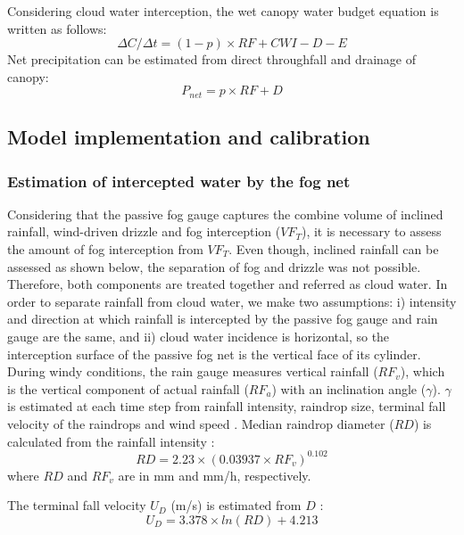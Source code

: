 \documentclass[a4paper,12pt]{article}
\begin{document}
\begin{linenumbers}
Considering cloud water interception, the wet canopy water budget equation is written as follows:
\begin{equation} \label{eq:fog_can_bal_cwi}
    \Delta C/\Delta t = (1 - p) \times RF + CWI - D - E 
\end{equation}
Net precipitation can be estimated from direct throughfall and drainage of canopy:
\begin{equation} \label{eq:fog_thfall}
P_{net}=p \times RF + D
\end{equation} 

\subsection{Model implementation and calibration}
\subsubsection{Estimation of intercepted water by the fog net}
Considering that the passive fog gauge captures the combine volume of inclined rainfall, wind-driven drizzle and fog interception ($VF_T$), it is necessary to assess the amount of fog interception from $VF_T$. Even though, inclined rainfall can be assessed as shown below, the separation of fog and drizzle was not possible. Therefore, both components are treated together and referred as cloud water. In order to separate rainfall from cloud water, we make two assumptions: i) intensity and direction at which rainfall is intercepted by the passive fog gauge and rain gauge are the same, and ii) cloud water incidence is horizontal, so the interception surface of the passive fog net is the vertical face of its cylinder. During windy conditions, the rain gauge measures vertical rainfall ($RF_v$), which is the vertical component of actual rainfall ($RF_a$) with an inclination angle ($\gamma$). $\gamma$ is estimated at each time step from rainfall intensity, raindrop size, terminal fall velocity of the raindrops and wind speed \citep{Holwerdaetal2006}. Median raindrop diameter ($RD$) is calculated from the rainfall intensity \citep{LawsandParsons1943, Holwerdaetal2006}:
 \begin{equation} \label{eq:fog_D}
    RD = 2.23 \times (0.03937 \times RF_v)^{0.102}
\end{equation}
where $RD$ and $RF_v$ are in mm and mm/h, respectively.

The terminal fall velocity $U_D$ (m/s) is estimated from $D$ \citep{GunnandKinzer1949, Holwerdaetal2006}:
\begin{equation} \label{eq:fog_UD}
    U_D = 3.378 \times ln(RD) + 4.213
\end{equation}


\end{linenumbers}
\end{document}
